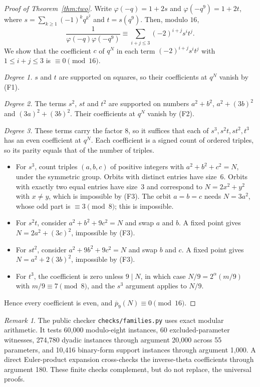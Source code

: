 \documentclass[11pt]{article}
\theoremstyle{remark}\newtheorem{remark}[theorem]{Remark}
\newcommand{\pb}{\overline{p}}
\begin{document}
\begin{proof}[Proof of Theorem~\ref{thm:two}]
Write $\varphi(-q)=1+2s$ and $\varphi(-q^9)=1+2t$, where $s=\sum_{k\ge1}(-1)^kq^{k^2}$ and $t=s(q^9)$. Then, modulo $16$,
\[\frac1{\varphi(-q)\varphi(-q^9)}\equiv\sum_{i+j\le3}(-2)^{i+j}s^it^j .\]
We show that the coefficient $c$ of $q^N$ in each term $(-2)^{i+j}s^it^j$ with $1\le i+j\le3$ is $\equiv 0\pmod{16}$.

\emph{Degree 1.} $s$ and $t$ are supported on squares, so their coefficients at $q^N$ vanish by (F1).

\emph{Degree 2.} The terms $s^2$, $st$ and $t^2$ are supported on numbers $a^2+b^2$, $a^2+(3b)^2$ and $(3a)^2+(3b)^2$. Their coefficients at $q^N$ vanish by (F2).

\emph{Degree 3.} These terms carry the factor $8$, so it suffices that each of $s^3,s^2t,st^2,t^3$ has an even coefficient at $q^N$. Each coefficient is a signed count of ordered triples, so its parity equals that of the number of triples.
\begin{itemize}
\item For $s^3$, count triples $(a,b,c)$ of positive integers with $a^2+b^2+c^2=N$, under the symmetric group. Orbits with distinct entries have size~$6$. Orbits with exactly two equal entries have size~$3$ and correspond to $N=2x^2+y^2$ with $x\ne y$, which is impossible by (F3). The orbit $a=b=c$ needs $N=3a^2$, whose odd part is $\equiv3\pmod 8$; this is impossible.
\item For $s^2t$, consider $a^2+b^2+9c^2=N$ and swap $a$ and $b$. A fixed point gives $N=2a^2+(3c)^2$, impossible by (F3).
\item For $st^2$, consider $a^2+9b^2+9c^2=N$ and swap $b$ and $c$. A fixed point gives $N=a^2+2(3b)^2$, impossible by (F3).
\item For $t^3$, the coefficient is zero unless $9\mid N$, in which case $N/9=2^\alpha(m/9)$ with $m/9\equiv7\pmod8$, and the $s^3$ argument applies to $N/9$.
\end{itemize}
Hence every coefficient is even, and $\pb_9(N)\equiv0\pmod{16}$.
\end{proof}

\begin{remark}
The public checker \texttt{checks/families.py} uses exact modular arithmetic. It tests 60,000 modulo-eight instances, 60 excluded-parameter witnesses, 274,780 dyadic instances through argument 20,000 across 55 parameters, and 10,416 binary-form support instances through argument 1,000. A direct Euler-product expansion cross-checks the inverse-theta coefficients through argument 180. These finite checks complement, but do not replace, the universal proofs.
\end{remark}
\end{document}
